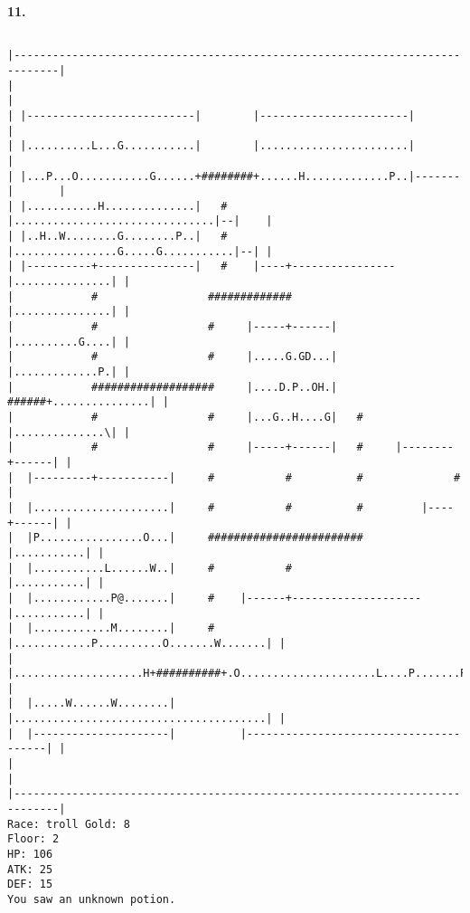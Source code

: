 \documentclass[11pt]{article}
\theoremstyle{plain}
\begin{document}
\newpage
\textbf{11. }
\begin{Verbatim}[fontsize=\scriptsize]

|-----------------------------------------------------------------------------|
|                                                                             |
| |--------------------------|        |-----------------------|               |
| |..........L...G...........|        |.......................|               |
| |...P...O...........G......+########+......H.............P..|-------|       |
| |...........H..............|   #    |...............................|--|    |
| |..H..W........G........P..|   #    |................G.....G...........|--| |
| |----------+---------------|   #    |----+----------------|...............| |
|            #                 #############                |...............| |
|            #                 #     |-----+------|         |..........G....| |
|            #                 #     |.....G.GD...|         |.............P.| |
|            ###################     |....D.P..OH.|   ######+...............| |
|            #                 #     |...G..H....G|   #     |..............\| |
|            #                 #     |-----+------|   #     |--------+------| |
|  |---------+-----------|     #           #          #              #        |
|  |.....................|     #           #          #         |----+------| |
|  |P................O...|     ########################         |...........| |
|  |...........L......W..|     #           #                    |...........| |
|  |............P@.......|     #    |------+--------------------|...........| |
|  |............M........|     #    |............P..........O.......W.......| |
|  |....................H+##########+.O.....................L....P.......P..| |
|  |.....W......W........|          |.......................................| |
|  |---------------------|          |---------------------------------------| |
|                                                                             |
|-----------------------------------------------------------------------------|
Race: troll Gold: 8                                                    Floor: 2
HP: 106
ATK: 25
DEF: 15
You saw an unknown potion. 
\end{Verbatim}
\end{document}
